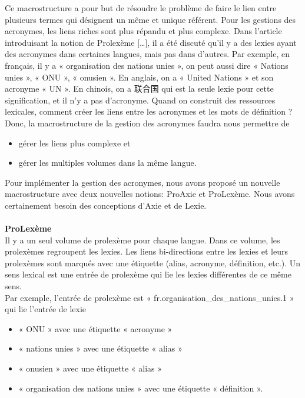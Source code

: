 \documentclass[10pt,a4paper,twoside]{article}
\begin{document}
Ce macrostructure a pour but de résoudre le problème de faire le lien entre plusieurs termes qui désignent un même et unique référent. Pour les gestions des acronymes, les liens riches sont plus répandu et plus complexe. Dans l'article introduisant la notion de Prolexème […], il a été discuté qu’il y a des lexies ayant des acronymes dans certaines langues, mais pas dans d'autres. Par exemple, en français, il y a « organisation des nations unies », on peut aussi dire « Nations unies », « ONU », « onusien ». En anglais, on a « United Nations » et son acronyme « UN ». En chinois, on a 联合国 qui est la seule lexie pour cette signification, et il n’y a pas d’acronyme. Quand on construit des ressources lexicales, comment créer les liens entre les acronymes et les mots de définition ? \\
Donc, la macrostructure de la gestion des acronymes faudra nous permettre de 
\begin{itemize}
\begin{itemize}
\item gérer les liens  plus complexe et
\item gérer les multiples volumes dans la même langue. 
\end{itemize}
\end{itemize}
Pour implémenter la gestion des acronymes, nous avons proposé un nouvelle macrostructure avec deux nouvelles notions: ProAxie et ProLexème. Nous avons certainement besoin des conceptions d’Axie et de Lexie. \\
\\
\textbf{ProLexème}\\
Il y a un seul volume de prolexème pour chaque langue. Dans ce volume, les prolexèmes regroupent les lexies. Les liens bi-directions entre les lexies et leurs prolexèmes sont marqués avec une étiquette (alias, acronyme, définition, etc.). Un sens lexical est une entrée de prolexème qui lie les lexies différentes de ce même sens. \\
Par exemple, l’entrée de prolexème est « fr.organisation\_des\_nations\_unies.1 » qui lie l’entrée de lexie 
\begin{itemize}
\begin{itemize}
\item « ONU » avec une étiquette « acronyme »
\item « nations unies » avec une étiquette « alias »
\item « onusien » avec une étiquette « alias »
\item « organisation des nations unies » avec une étiquette « définition ».
\end{itemize}
\end{itemize}
\end{document}
